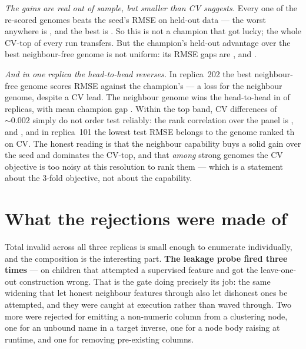 \documentclass[11pt]{article}
\newcommand{\rA}{\textcolor{accent}{replica~101}}
\newcommand{\rB}{\textcolor{warm}{replica~202}}
\begin{document}
\emph{The gains are real out of sample, but smaller than CV suggests.} Every one of the
\allPanelScored{} re-scored genomes beats the seed's \rASeedRmse{} RMSE on held-out data ---
the worst anywhere is \allPanelWorstRmse{}, and the best is \allPanelBestRmse{}. So this is
not a champion that got lucky; the whole CV-top of every run transfers. But the champion's
held-out advantage over the best neighbour-free genome is not uniform: its RMSE gaps are
\rANbrGapRmse{}, \rBNbrGapRmse{} and \rCNbrGapRmse{}.

\emph{And in one replica the head-to-head reverses.} In \rB{} the best neighbour-free
genome scores \rBNoNbrRmse{} RMSE against the champion's \rBBestRmse{} --- a
\rBNbrGapRmse{} loss for the neighbour genome, despite a \rBNbrGapCV{} CV lead. The
neighbour genome wins the head-to-head in \allNbrGapRmseWins{} of \allReplicas{} replicas,
with mean champion gap \allNbrGapRmseMean{}. Within the top band, CV differences of
${\sim}0.002$ simply do
not order test reliably: the rank correlation over the panel is \rAPanelRho{},
\rBPanelRho{} and \rCPanelRho{}, and in \rA{} the lowest test RMSE belongs to the genome
ranked \rAPanelTopRmseCVRank{}th on CV. The honest reading is that the neighbour capability
buys a solid gain over the seed and dominates the CV-top, and that \emph{among} strong
genomes the CV objective is too noisy at this resolution to rank them --- which is a
statement about the 3-fold objective, not about the capability.

\section{What the rejections were made of}
\label{sec:rejections}

\begin{table}[H]\centering\small

\caption{Every invalid child, bucketed by the guard that rejected it. The first row is the
one the grammar owns and it is empty everywhere: across \allPrograms{} children, not one was
rejected for being unparseable or schema-invalid. Every rejection was semantic.}
\end{table}

\noindent
Total invalid across all three replicas is small enough to enumerate individually, and the
composition is the interesting part. \textbf{The leakage probe fired three times} --- on
children that attempted a supervised feature and got the leave-one-out construction wrong.
That is the gate doing precisely its job: the same widening that let \allNbrBuilt{} honest
neighbour features through also let dishonest ones be attempted, and they were caught at
execution rather than waved through. Two more were rejected for emitting a non-numeric
column from a clustering node, one for an unbound name in a target inverse, one for a node
body raising at runtime, and one for removing pre-existing columns.
\end{document}
